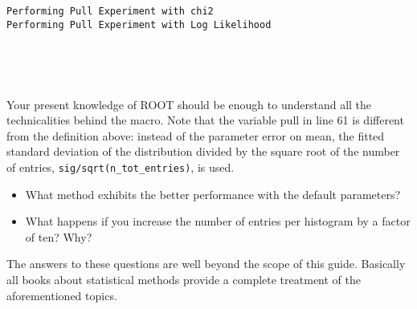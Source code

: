 \documentclass{article}
\begin{document}
    \begin{Verbatim}[commandchars=\\\{\}]
Performing Pull Experiment with chi2 
Performing Pull Experiment with Log Likelihood
    \end{Verbatim}

    \begin{center}
    \end{center}
    { \hspace*{\fill} \\}
    
    \begin{center}
    \end{center}
    { \hspace*{\fill} \\}
    
    Your present knowledge of ROOT should be enough to understand all the
technicalities behind the macro. Note that the variable pull in line 61
is different from the definition above: instead of the parameter error
on mean, the fitted standard deviation of the distribution divided by
the square root of the number of entries,
\texttt{sig/sqrt(n\_tot\_entries)}, is used.

\begin{itemize}
\item
  What method exhibits the better performance with the default
  parameters?
\item
  What happens if you increase the number of entries per histogram by a
  factor of ten? Why?
\end{itemize}

The answers to these questions are well beyond the scope of this guide.
Basically all books about statistical methods provide a complete
treatment of the aforementioned topics.


    
    
    
    
\end{document}
